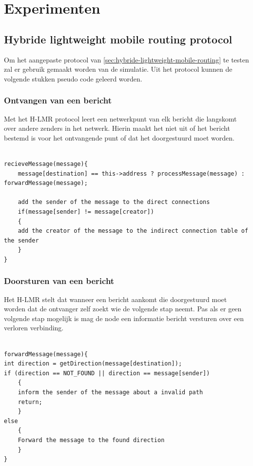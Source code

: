 \documentclass[a4paper, 11pt, oneside]{report}
\begin{document}
\chapter{Experimenten}
\label{experimenten}


\section[Hybride-LMR]{Hybride lightweight mobile routing protocol}

Om het aangepaste protocol van \autoref{sec:hybride-lightweight-mobile-routing} te testen zal er gebruik gemaakt worden van de simulatie.
Uit het protocol kunnen de volgende stukken pseudo code geleerd worden.

\subsection{Ontvangen van een bericht}

Met het H-LMR protocol leert een netwerkpunt van elk bericht die langskomt over andere zenders in het netwerk.
Hierin maakt het niet uit of het bericht bestemd is voor het ontvangende punt of dat het doorgestuurd moet worden. 

\begin{lstlisting}

recieveMessage(message){
	message[destination] == this->address ? processMessage(message) : forwardMessage(message);
	
	add the sender of the message to the direct connections
	if(message[sender] != message[creator])
	{
	add the creator of the message to the indirect connection table of the sender
	}
}

\end{lstlisting}

\subsection{Doorsturen van een bericht}

Het H-LMR stelt dat wanneer een bericht aankomt die doorgestuurd moet worden dat de ontvanger zelf zoekt wie de volgende stap neemt.
Pas als er geen volgende stap mogelijk is mag de node een informatie bericht versturen over een verloren verbinding.

\begin{lstlisting}

forwardMessage(message){
int direction = getDirection(message[destination]);
if (direction == NOT_FOUND || direction == message[sender])
	{
	inform the sender of the message about a invalid path
	return;
	}
else 
	{
	Forward the message to the found direction
	}	
}

\end{lstlisting}
\end{document}
